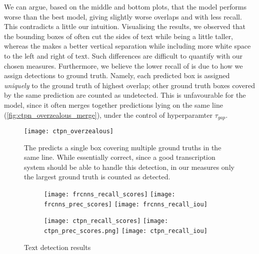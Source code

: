 		We can argue, based on the middle and bottom plots, that the model performs worse than the best \FRCNN{} model, giving slightly worse overlaps and with less recall. This contradicts a little our intuition. Visualising the results, we observed that the bounding boxes of \FRCNN{} often cut the sides of text while being a little taller, whereas the \CTPN{} makes a better vertical separation while including more white space to the left and right of text. Such differences are difficult to quantify with our chosen measures. Furthermore, we believe the lower recall of \CTPN{} is due to how we assign detections to ground truth. Namely, each predicted box is assigned \emph{uniquely} to the ground truth of highest overlap; other ground truth boxes covered by the same prediction are counted as undetected. This is unfavourable for the model, since it often merges together predictions lying on the same line (\autoref{fig:ctpn_overzealous_merge}), under the control of hyperparamter \(\tau_{gap}\).
		\begin{figure}
			\texttt{[image: ctpn\_overzealous]}
			\caption[\CTPN{} overzealous merging]{The \CTPN{} predicts a single box covering multiple ground truths in the same line. While essentially correct, since a good transcription system should be able to handle this detection, in our measures only the largest ground truth is counted as detected.}
			\label{fig:ctpn_overzealous_merge}
		\end{figure}

		\begin{figure}
			\vspace{-2em}
			\begin{subfigure}{.49\linewidth}
					\caption{\FRCNN{}}\label{fig:frcnn_results}
					\texttt{[image: frcnns\_recall\_scores]}
					\texttt{[image: frcnns\_prec\_scores]}
					\texttt{[image: frcnns\_recall\_iou]}
			\end{subfigure}
			\begin{subfigure}{.49\linewidth}
					\caption{\CTPN{}}\label{fig:ctpn_results}
					\texttt{[image: ctpn\_recall\_scores]}
					\texttt{[image: ctpn\_prec\_scores.png]}
					\texttt{[image: ctpn\_recall\_iou]}
			\end{subfigure}
			\caption{Text detection results}
			\label{fig:frcnn_results}
		\end{figure}
